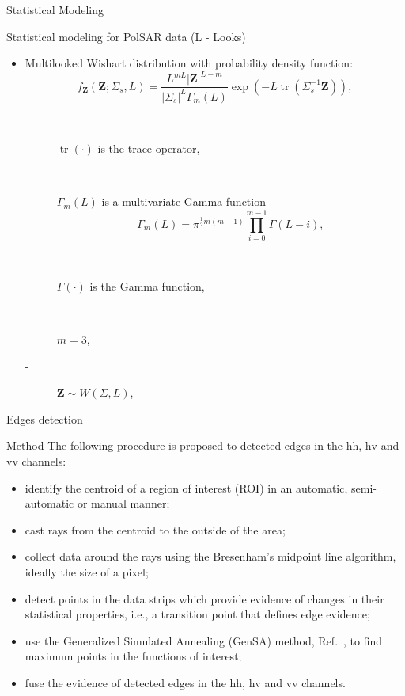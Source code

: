 \documentclass[10pt,professionalfonts]{beamer}
\DeclareMathOperator{\traco}{tr} %
\begin{document}
\begin{frame}[fragile]{Statistical Modeling}
\begin{alertblock}{Statistical modeling for PolSAR data (L - Looks)}
\begin{itemize}
\item Multilooked Wishart distribution with probability density function:
\begin{equation}
    f_{\mathbf{Z}}(\mathbf{Z};\Sigma_{s},L)=\frac{L^{mL}|\mathbf{Z}|^{L-m}}{|\Sigma_{s}|^{L}\Gamma_m(L)} \exp(-L\traco(\Sigma_{s}^{-1}\mathbf{Z})),
    \label{eq_04}
\end{equation} 
\begin{description}
\item[-] $\traco(\cdot)$ is the trace operator,
\item[-] $\Gamma_m(L)$ is a multivariate Gamma function
\begin{equation*}
	\Gamma_m(L)=\pi^{\frac{1}{2}m(m-1)} \prod_{i=0}^{m-1}\Gamma(L-i),
\end{equation*}
\item[-]$\Gamma(\cdot)$ is the Gamma function,
\item[-]$m=3$,
\item[-]$\mathbf{Z}\sim W(\Sigma, L)$, 
\end{description} 
\end{itemize}
\end{alertblock}
\end{frame}

\begin{frame}[fragile]{Edges detection}
\begin{alertblock}{Method}
The following procedure is proposed to detected edges in the $\text{hh}$, $\text{hv}$ and $\text{vv}$ channels:
\begin{itemize}
	\item identify the centroid of a region of interest (ROI) in an automatic, semi-automatic or manual manner;
	\item cast rays from the centroid to the outside of the area;
	\item collect data around the rays using the  Bresenham's midpoint line algorithm, ideally the size of a pixel;
	\item detect points in the data strips which provide evidence of changes in their statistical properties, i.e., a transition point that defines edge evidence;
	\item use the Generalized Simulated Annealing (GenSA) method, Ref.~\cite{xgsh}, to find maximum points in the functions of interest;
	\item fuse the evidence of detected edges in the $\text{hh}$, $\text{hv}$ and $\text{vv}$ channels.
\end{itemize}
\end{alertblock}
\end{frame}
\end{document}
